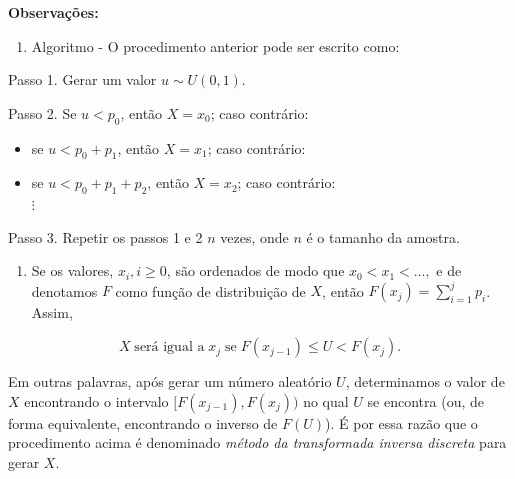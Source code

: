 \documentclass[
  letterpaper,
  DIV=11,
  numbers=noendperiod]{scrreprt}
\providecommand{\tightlist}{%
  \setlength{\itemsep}{0pt}\setlength{\parskip}{0pt}}\usepackage{longtable,booktabs,array}
\begin{document}
\begin{tcolorbox}[enhanced jigsaw, left=2mm, rightrule=.15mm, toprule=.15mm, opacityback=0, leftrule=.75mm, colframe=quarto-callout-important-color-frame, colback=white, breakable, arc=.35mm, bottomrule=.15mm]

\vspace{-3mm}\textbf{Observações:}\vspace{3mm}

\begin{enumerate}
\def\labelenumi{\arabic{enumi}.}
\tightlist
\item
  Algoritmo - O procedimento anterior pode ser escrito como:
\end{enumerate}

Passo 1. Gerar um valor \(u \sim U(0,1)\).

Passo 2. Se \(u < p_0\), então \(X = x_0\); caso contrário:

\begin{itemize}
\tightlist
\item
  se \(u < p_0 + p_1\), então \(X = x_1\); caso contrário:\\
\item
  se \(u < p_0 + p_1 + p_2\), então \(X = x_2\); caso contrário:\\
  \(\vdots\)
\end{itemize}

Passo 3. Repetir os passos 1 e 2 \(n\) vezes, onde \(n\) é o tamanho da
amostra.

\begin{enumerate}
\def\labelenumi{\arabic{enumi}.}
\setcounter{enumi}{1}
\tightlist
\item
  Se os valores, \(x_i, i \geq 0\), são ordenados de modo que
  \(x_0 < x_1 < \dots,\) e de denotamos \(F\) como função de
  distribuição de \(X\), então \(F(x_j) = \sum\limits_{i=1}^{j}p_i\).
  Assim,
\end{enumerate}

\[X\; \text{será igual a}\; x_j\; \text{se}\; F(x_{j-1}) \leq U < F(x_j).\]

\end{tcolorbox}

Em outras palavras, após gerar um número aleatório \(U\), determinamos o
valor de \(X\) encontrando o intervalo \([F(x_{j-1}), F(x_j))\) no qual
\(U\) se encontra (ou, de forma equivalente, encontrando o inverso de
\(F(U)\)). É por essa razão que o procedimento acima é denominado
\emph{método da transformada inversa discreta} para gerar \(X\).
\end{document}
